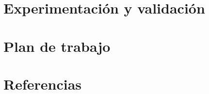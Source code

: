 \documentclass[a4paper,10pt]{article}
\begin{document}
\section{Experimentación y validación}

\section{Plan de trabajo}

\section{Referencias}
\renewcommand{\section}[2]{}


\end{document}
